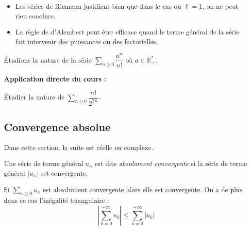 \documentclass[french,11pt,twoside]{VcCours}
\newenvironment{ApplicationDirecte}{\textbf{Application directe du cours :}

}{}
\newcommand{\Sum}[2]{\ensuremath{\textstyle{\sum\limits_{#1}^{#2}}}}
\begin{document}
\begin{Remarques}{}
	\begin{itemize}
\item Les séries de Riemann justifient bien que dans le cas où $\ell=1$, on ne peut rien conclure.
\item La règle de d'Alembert peut être efficace quand le terme général de la série fait intervenir des puissances ou des factorielles.
	\end{itemize}
\end{Remarques}

\newpage
\begin{Exemple} Étudions la nature de la série $\Sum{n \geq 0}{} \dfrac{a^n}{n!}$ où $a \in \mathbb{R}_+^{*}$.

\vspace{3cm}
\end{Exemple}

\begin{ApplicationDirecte} Étudier la nature de $\Sum{n \geq 0}{} \dfrac{n!}{2^{2n}}\cdot$
\end{ApplicationDirecte}
\subsection{Convergence absolue}

Dans cette section, la suite est réelle ou complexe.

\begin{Definition}{} Une série de terme général $u_n$ est dite \emph{absolument convergente} si la série de terme général $\vert u_n \vert$ est convergente.
\end{Definition}

\begin{Theoreme}{} Si $\Sum{n \geq 0}{} u_n$ est absolument convergente alors elle est convergente. On a de plus dans ce cas l'inégalité triangulaire :
$$ \left\vert \sum_{k=0}^{+ \infty} u_k \right\vert \leq \sum_{k=0}^{+ \infty} \vert u_k \vert$$
\end{Theoreme}
\end{document}

